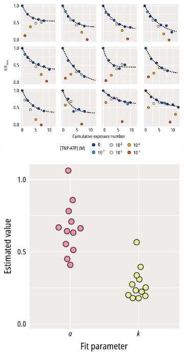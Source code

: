 \begin{figure}[hbtp]
	\centering
	\begin{subfigure}[t]{0.9\textwidth}
		\caption{}\label{ch3fig:bleaching_plots_1}
		\centering
		\includegraphics[width=\textwidth]{bleaching_plots_1.pdf}
	\end{subfigure}
	\vfill
	\begin{subfigure}[t]{0.45\textwidth}
		\caption{}\label{ch3fig:bleaching_terms_1}
		\centering
		\includegraphics[width=\textwidth]{bleaching_terms_1.pdf}

\end{subfigure}
\end{figure}
